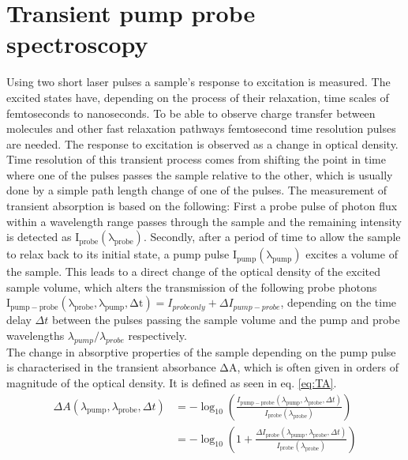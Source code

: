 \documentclass[twoside,openright]{scrreprt}
\begin{document}
\section{Transient pump probe spectroscopy}
Using two short laser pulses a sample's response to excitation is measured. The excited states have, depending on the process of their relaxation, time scales of femtoseconds to nanoseconds. To be able to observe charge transfer between molecules and other fast relaxation pathways femtosecond time resolution pulses are needed. The response to excitation is observed as a change in optical density. Time resolution of this transient process comes from shifting the point in time where one of the pulses passes the sample relative to the other, which is usually done by a simple path length change of one of the pulses.\newline
The measurement of transient absorption is based on the following: First a probe pulse of photon flux within a wavelength range passes through the sample and the remaining intensity is detected as $\mathrm{I_{probe}(\lambda_{probe})}$. 
Secondly, after a period of time to allow the sample to relax back to its initial state, a pump pulse $\mathrm{I_{pump}(\lambda_{pump})}$ excites a volume of the sample. This leads to a direct change of the optical density of the excited sample volume, which alters the transmission of the following probe photons $\mathrm{I_{pump-probe}(\lambda_{probe}, \lambda_{pump}, \Delta t)} = I_{probe only}+\Delta I_{pump-probe}$, depending on the time delay $\Delta t$ between the pulses passing the sample volume and the pump and probe wavelengths $\lambda_{pump}/\lambda_{probe}$ respectively. \\
The change in absorptive properties of the sample depending on the pump pulse is characterised in the transient absorbance $\mathrm{\Delta A}$, which is often given in orders of magnitude of the optical density. It is defined as seen in eq. \ref{eq:TA}.
\begin{equation}\label{eq:TA}
\begin{split}
\Delta A(\lambda_{\mathrm{pump}}, \lambda_{\mathrm{probe}}, \Delta t)&=-\log _{10}\left(\frac{I_{\mathrm{pump}-\mathrm{probe}}\left(\lambda_{\mathrm{pump}}, \lambda_{\mathrm{probe}}, \Delta t\right)}{I_{\mathrm{probe}}\left(\lambda_{\mathrm{probe}}\right)}\right)\\
&=-\log _{10}\left(1+\frac{\Delta I_{\mathrm{probe}}\left(\lambda_{\mathrm{pump}}, \lambda_{\mathrm{probe}}, \Delta t\right)}{I_{\mathrm{probe}}\left(\lambda_{\mathrm{probe}}\right)}\right)
\end{split}
\end{equation}
\end{document}
